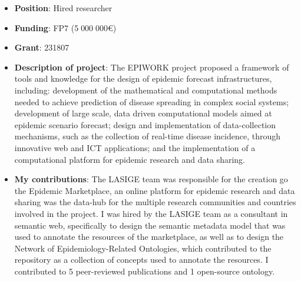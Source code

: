 \begin{itemize}
    \item \textbf{Position}: Hired researcher
    \item \textbf{Funding}: FP7 (5$\;$000$\;$000€)
    \item \textbf{Grant}: 231807
    \item \textbf{Description of project}: The EPIWORK project proposed a framework of tools and knowledge for the design of epidemic forecast infrastructures, including: development of the mathematical and computational methods needed to achieve prediction of disease spreading in complex social systems; development of large scale, data driven computational models aimed at epidemic scenario forecast; design and implementation of data-collection mechanisms, such as the collection of real-time disease incidence, through innovative web and ICT applications; and the implementation of a computational platform for epidemic research and data sharing.
    \item \textbf{My contributions}: The LASIGE team was responsible for the creation go the Epidemic Marketplace, an online platform for epidemic research and data sharing was the data-hub for the multiple research communities and countries involved in the project. I was hired by the LASIGE team as a consultant in semantic web, specifically to design the semantic metadata model that was used to annotate the resources of the marketplace, as well as to design the Network of Epidemiology-Related Ontologies, which contributed to the repository as a collection of concepts used to annotate the resources. I contributed to 5 peer-reviewed publications and 1 open-source ontology.
\end{itemize}

